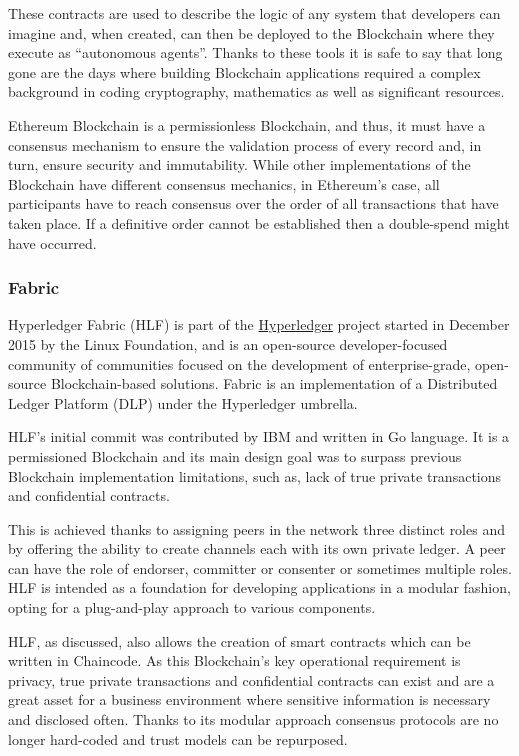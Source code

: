 These contracts are used to describe the logic of any system that developers
can imagine and, when created, can then be deployed to the Blockchain where
they execute as “autonomous agents”.  Thanks to these tools it is safe to say
that long gone are the days where building Blockchain applications required a
complex background in coding cryptography, mathematics as well as significant
resources.\cite{Wood2017,BlockGeeks2017}

Ethereum Blockchain is a permissionless Blockchain, and thus, it must have a
consensus mechanism to ensure the validation process of every record and, in
turn, ensure security and immutability. While other implementations of the
Blockchain have different consensus mechanics, in Ethereum’s case, all
participants have to reach consensus over the order of all transactions that
have taken place. If a definitive order cannot be established then a
double-spend might have occurred.

\subsubsection{Fabric}

Hyperledger Fabric (HLF) is part of the
\href{http://www.hyperledger.org/projects/fabric}{Hyperledger} project started
in December 2015 by the Linux Foundation, and is an open-source
developer-focused community of communities focused on the development of
enterprise-grade, open-source Blockchain-based solutions.  Fabric is an
implementation of a Distributed Ledger Platform (DLP) under the Hyperledger
umbrella.  \cite{Cachin2016}

HLF’s initial commit was contributed by IBM and written in Go language.  It is
a permissioned Blockchain and its main design goal was to surpass previous
Blockchain implementation limitations, such as, lack of true private
transactions and confidential contracts.

This is achieved thanks to assigning peers in the network three distinct roles
and by offering the ability to create channels each with its own private
ledger.  A peer can have the role of endorser, committer or consenter or
sometimes multiple roles.  HLF is intended as a foundation for developing
applications in a modular fashion, opting for a plug-and-play approach to
various components. \cite{HyperledgerFabricDocs2017}

HLF, as discussed, also allows the creation of smart contracts which can be
written in Chaincode.  As this Blockchain's key operational requirement is
privacy, true private transactions and confidential contracts can exist and are
a great asset for a business environment where sensitive information is
necessary and disclosed often.  Thanks to its modular approach consensus
protocols are no longer hard-coded and trust models can be repurposed.

